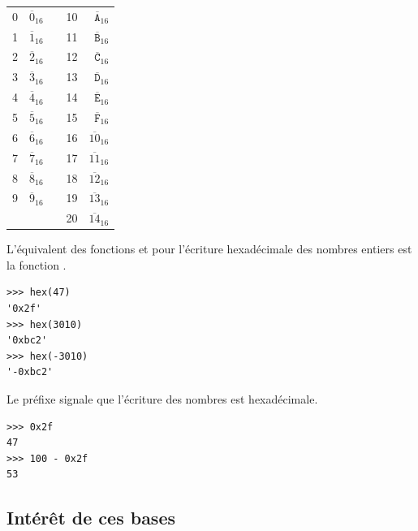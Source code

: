 \documentclass[class=report,crop=false]{standalone}
\begin{document}
  \bigskip
  


  
  \begin{center}
    \begin{tabular}[ht]{rrp{2cm}rr}
      0 & $\overline{0}_{16}$ & &10 & $\overline{\mathtt{A}}_{16}$\\
      1 & $\overline{1}_{16}$ & &11 & $\overline{\mathtt{B}}_{16}$\\
      2 & $\overline{2}_{16}$ & &12 & $\overline{\mathtt{C}}_{16}$\\
      3 & $\overline{3}_{16}$ & &13 & $\overline{\mathtt{D}}_{16}$\\
      4 & $\overline{4}_{16}$ & &14 & $\overline{\mathtt{E}}_{16}$\\
      5 & $\overline{5}_{16}$ & &15 & $\overline{\mathtt{F}}_{16}$\\
      6 & $\overline{6}_{16}$ & &16 & $\overline{10}_{16}$\\
      7 & $\overline{7}_{16}$ & &17 & $\overline{11}_{16}$\\
      8 & $\overline{8}_{16}$ & &18 & $\overline{12}_{16}$\\
      9 & $\overline{9}_{16}$ & &19 & $\overline{13}_{16}$\\
      &  & &20 & $\overline{14}_{16}$\\
    \end{tabular}
  \end{center}

  
L'équivalent des fonctions  et  pour l'écriture
hexadécimale des nombres entiers est la fonction .

\begin{lstlisting}
>>> hex(47)
'0x2f'
>>> hex(3010)
'0xbc2'
>>> hex(-3010)
'-0xbc2'  
\end{lstlisting}

Le préfixe  signale que l'écriture des nombres est hexadécimale.

\begin{lstlisting}
>>> 0x2f
47
>>> 100 - 0x2f
53
\end{lstlisting}

\subsection{Intérêt de ces bases}
\end{document}
